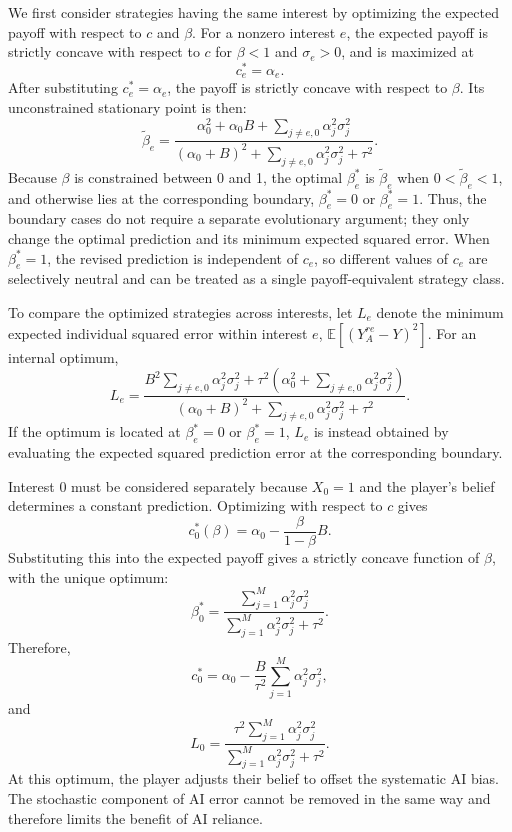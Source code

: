 \documentclass[12pt]{article}
\begin{document}
We first consider strategies having the same interest by optimizing the expected payoff with respect to $c$ and $\beta$.
For a nonzero interest $e$, the expected payoff is strictly concave with respect to $c$ for $\beta<1$ and $\sigma_e>0$, and is maximized at
\begin{equation}
c_e^*=\alpha_e.
\end{equation}
After substituting $c_e^*=\alpha_e$, the payoff is strictly concave with respect to $\beta$.
Its unconstrained stationary point is then:
\begin{equation}
\tilde{\beta}_e = \frac{\alpha_0^2+\alpha_0B+\sum_{j\neq e,0}\alpha_j^2\sigma_j^2}{(\alpha_0+B)^2+\sum_{j\neq e,0}\alpha_j^2\sigma_j^2+\tau^2}.
\end{equation}
Because $\beta$ is constrained between 0 and 1, the optimal $\beta_e^*$ is $\tilde{\beta}_e$ when $0<\tilde{\beta}_e<1$, and otherwise lies at the corresponding boundary, $\beta_e^*=0$ or $\beta_e^*=1$.
Thus, the boundary cases do not require a separate evolutionary argument; they only change the optimal prediction and its minimum expected squared error.
When $\beta_e^*=1$, the revised prediction is independent of $c_e$, so different values of $c_e$ are selectively neutral and can be treated as a single payoff-equivalent strategy class.

To compare the optimized strategies across interests, let $L_e$ denote the minimum expected individual squared error within interest $e$, $\mathbb{E}[(Y_A^{re}-Y)^2]$.
For an internal optimum,
\begin{equation}
L_e=\frac{B^2\sum_{j\neq e,0}\alpha_j^2\sigma_j^2+\tau^2\left(\alpha_0^2+\sum_{j\neq e,0}\alpha_j^2\sigma_j^2\right)}{(\alpha_0+B)^2+\sum_{j\neq e,0}\alpha_j^2\sigma_j^2+\tau^2}.
\end{equation}
If the optimum is located at $\beta_e^*=0$ or $\beta_e^*=1$, $L_e$ is instead obtained by evaluating the expected squared prediction error at the corresponding boundary.

Interest 0 must be considered separately because $X_0=1$ and the player's belief determines a constant prediction. Optimizing with respect to $c$ gives
\begin{equation}
c_0^*(\beta)=\alpha_0-\frac{\beta}{1-\beta}B.
\end{equation}
Substituting this into the expected payoff gives a strictly concave function of $\beta$, with the unique optimum:
\begin{equation}
\beta_0^* = \frac{\sum_{j=1}^{M}\alpha_j^2\sigma_j^2}{\sum_{j=1}^{M}\alpha_j^2\sigma_j^2+\tau^2}.
\end{equation}
Therefore,
\begin{equation}
c_0^* = \alpha_0-\frac{B}{\tau^2}\sum_{j=1}^{M}\alpha_j^2\sigma_j^2,
\end{equation}
and
\begin{equation}
L_0 = \frac{\tau^2\sum_{j=1}^{M}\alpha_j^2\sigma_j^2}{\sum_{j=1}^{M}\alpha_j^2\sigma_j^2+\tau^2}.
\end{equation}
At this optimum, the player adjusts their belief to offset the systematic AI bias.
The stochastic component of AI error cannot be removed in the same way and therefore limits the benefit of AI reliance.
\end{document}
